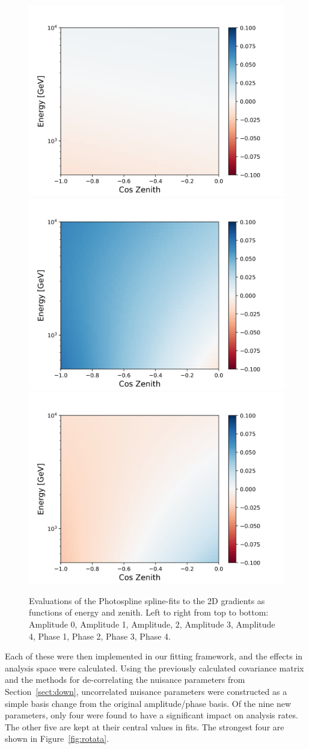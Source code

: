 \documentclass[main.tex]{subfiles}
\begin{document}
\begin{figure}
    \includegraphics[width=0.3\linewidth]{figures/spline_phase02_gradient.png}%
    \includegraphics[width=0.3\linewidth]{figures/spline_phase03_gradient.png}%
    \includegraphics[width=0.3\linewidth]{figures/spline_phase04_gradient.png}
    \caption{Evaluations of the Photospline spline-fits to the 2D gradients as functions of energy and zenith. Left to right from top to bottom: Amplitude 0, Amplitude 1, Amplitude, 2, Amplitude 3, Amplitude 4, Phase 1, Phase 2, Phase 3, Phase 4.}\label{fig:gradients}
\end{figure}

Each of these were then implemented in our fitting framework, and the effects in analysis space were calculated. 
Using the previously calculated covariance matrix and the methods for de-correlating the nuisance parameters from Section~\ref{sect:down}, uncorrelated nuisance parameters were constructed as a simple basis change from the original amplitude/phase basis. 
Of the nine new parameters, only four were found to have a significant impact on analysis rates. The other five are kept at their central values in fits. 
The strongest four are shown in Figure~\ref{fig:rotata}.
\end{document}
